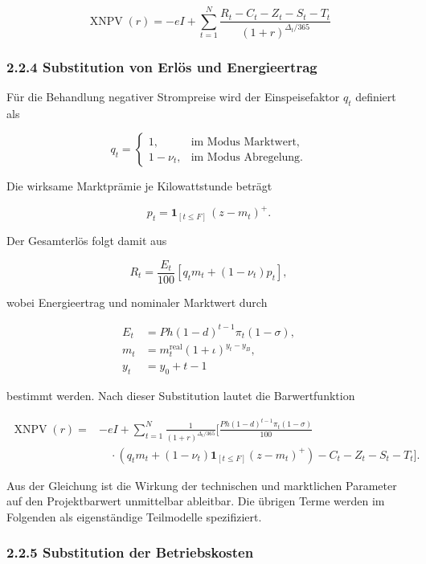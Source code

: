 \documentclass[
  a4paper,
  10pt]{article}
\begin{document}
\[
\boxed{
\operatorname{XNPV}(r)
  = -eI
    + \sum_{t=1}^{N}
      \frac{R_t-C_t-Z_t-S_t-T_t}
           {(1+r)^{\Delta_t/365}}
}
\]

\hypertarget{substitution-von-erluxf6s-und-energieertrag}{%
\subsubsection{2.2.4 Substitution von Erlös und
Energieertrag}\label{substitution-von-erluxf6s-und-energieertrag}}

Für die Behandlung negativer Strompreise wird der Einspeisefaktor
\(q_t\) definiert als

\[
q_t =
\begin{cases}
1, & \text{im Modus Marktwert},\\
1-\nu_t, & \text{im Modus Abregelung}.
\end{cases}
\]

Die wirksame Marktprämie je Kilowattstunde beträgt

\[
p_t
  = \mathbf{1}_{[t\leq F]}\,(z-m_t)^+.
\]

Der Gesamterlös folgt damit aus

\[
R_t
  = \frac{E_t}{100}
    \left[q_t m_t+(1-\nu_t)p_t\right],
\]

wobei Energieertrag und nominaler Marktwert durch

\[
\begin{aligned}
E_t
  &= P h(1-d)^{t-1}\pi_t(1-\sigma),\\
m_t
  &= m_t^{\mathrm{real}}(1+\iota)^{y_t-y_B},\\
y_t
  &= y_0+t-1
\end{aligned}
\]

bestimmt werden. Nach dieser Substitution lautet die Barwertfunktion

\[
\begin{aligned}
\operatorname{XNPV}(r)
={}&-eI+\sum_{t=1}^{N}\frac{1}{(1+r)^{\Delta_t/365}}
\Bigg[
\frac{P h(1-d)^{t-1}\pi_t(1-\sigma)}{100}\\
&\quad\cdot\left(
q_t m_t+(1-\nu_t)\mathbf{1}_{[t\leq F]}(z-m_t)^+
\right)
-C_t-Z_t-S_t-T_t
\Bigg].
\end{aligned}
\]

Aus der Gleichung ist die Wirkung der technischen und marktlichen
Parameter auf den Projektbarwert unmittelbar ableitbar. Die übrigen
Terme werden im Folgenden als eigenständige Teilmodelle spezifiziert.

\hypertarget{substitution-der-betriebskosten}{%
\subsubsection{2.2.5 Substitution der
Betriebskosten}\label{substitution-der-betriebskosten}}
\end{document}
